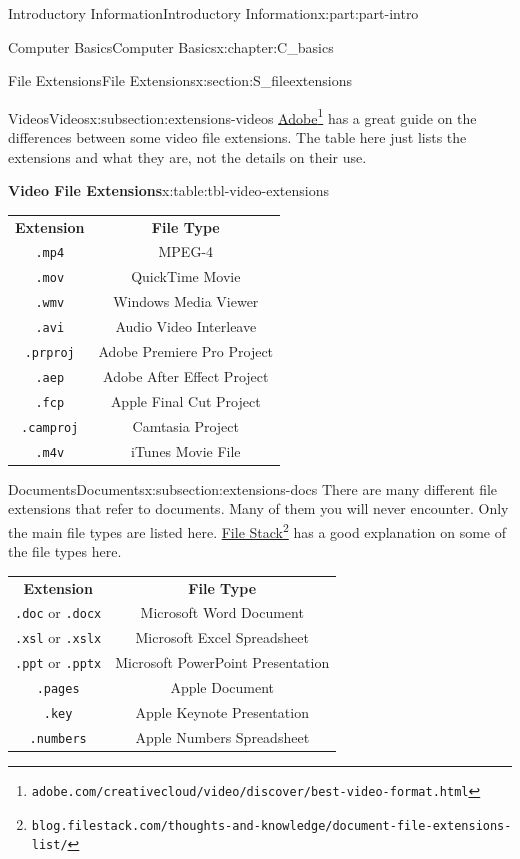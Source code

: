 \documentclass[oneside,10pt,]{book}
\newcommand{\tabularfont}{\relax}
\newcommand{\mono}[1]{\texttt{#1}}
\begin{document}
\begin{partptx}{Introductory Information}{}{Introductory Information}{}{}{x:part:part-intro}
\begin{chapterptx}{Computer Basics}{}{Computer Basics}{}{}{x:chapter:C_basics}
\begin{sectionptx}{File Extensions}{}{File Extensions}{}{}{x:section:S_fileextensions}
\begin{subsectionptx}{Videos}{}{Videos}{}{}{x:subsection:extensions-videos}
%
\href{https://www.adobe.com/creativecloud/video/discover/best-video-format.html}{Adobe}\footnote{\nolinkurl{adobe.com/creativecloud/video/discover/best-video-format.html}\label{g:fn:idp615271832}} has a great guide on the differences between some video file extensions. The table here just lists the extensions and what they are, not the details on their use.%
\begin{tableptx}{\textbf{Video File Extensions}}{x:table:tbl-video-extensions}{}%
\centering%
{\tabularfont%
\begin{tabular}{cc}
\textbf{Extension}&\textbf{File Type}\tabularnewline[0pt]
\mono{.mp4}&MPEG-4\tabularnewline[0pt]
\mono{.mov}&QuickTime Movie\tabularnewline[0pt]
\mono{.wmv}&Windows Media Viewer\tabularnewline[0pt]
\mono{.avi}&Audio Video Interleave\tabularnewline[0pt]
\mono{.prproj}&Adobe Premiere Pro Project\tabularnewline[0pt]
\mono{.aep}&Adobe After Effect Project\tabularnewline[0pt]
\mono{.fcp}&Apple Final Cut Project\tabularnewline[0pt]
\mono{.camproj}&Camtasia Project\tabularnewline[0pt]
\mono{.m4v}&iTunes Movie File
\end{tabular}
}%
\end{tableptx}%
\end{subsectionptx}
%
%
\typeout{************************************************}
\typeout{************************************************}
%
\begin{subsectionptx}{Documents}{}{Documents}{}{}{x:subsection:extensions-docs}
%
There are many different file extensions that refer to documents. Many of them you will never encounter. Only the main file types are listed here. \href{https://blog.filestack.com/thoughts-and-knowledge/document-file-extensions-list/}{File Stack}\footnote{\nolinkurl{blog.filestack.com/thoughts-and-knowledge/document-file-extensions-list/}\label{g:fn:idp615275160}} has a good explanation on some of the file types here.%
\begin{center}%
{\tabularfont%
\begin{tabular}{cc}
\textbf{Extension}&\textbf{File Type}\tabularnewline[0pt]
\mono{.doc} or \mono{.docx}&Microsoft Word Document\tabularnewline[0pt]
\mono{.xsl} or \mono{.xslx}&Microsoft Excel Spreadsheet\tabularnewline[0pt]
\mono{.ppt} or \mono{.pptx}&Microsoft PowerPoint Presentation\tabularnewline[0pt]
\mono{.pages}&Apple Document\tabularnewline[0pt]
\mono{.key}&Apple Keynote Presentation\tabularnewline[0pt]
\mono{.numbers}&Apple Numbers Spreadsheet\tabularnewline[0pt]

\end{tabular}}
\end{center}
\end{subsectionptx}
\end{sectionptx}
\end{chapterptx}
\end{partptx}
\end{document}
